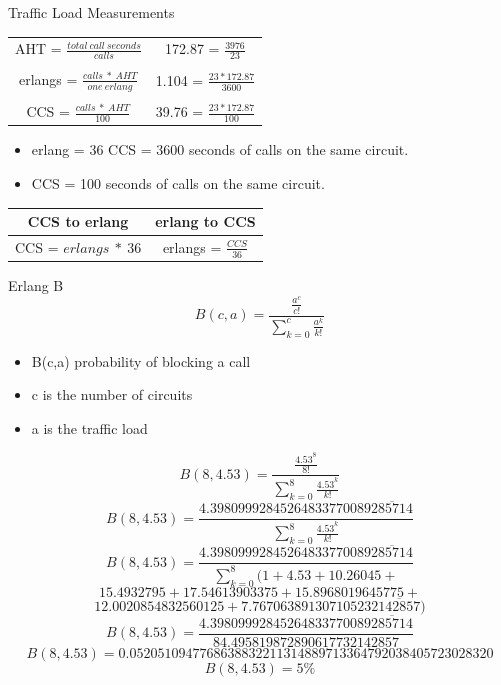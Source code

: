 \documentclass[landscape,fontscale=1,margin=0.2cm,paperwidth=70truecm, paperheight=40truecm,debug]{baposter}
\begin{document}
\begin{poster}
\begin{posterbox}[column=0,below=auto,height=bottom]{Traffic Load Measurements}
\begin{center}
\begin{tabular}{|c|c|}
AHT = $\frac{total~call~seconds}{calls}$ & 172.87 = $\frac{3976}{23}$\\
&\\
erlangs = $\frac{calls~*~AHT}{one~erlang}$ & 1.104 = $\frac{23 * 172.87}{3600}$\\
&\\
CCS = $\frac{calls~*~AHT}{100}$ & 39.76 = $\frac{23 * 172.87}{100}$\\\hline
\end{tabular}
\end{center}
\begin{itemize}
\item erlang = 36 CCS = 3600 seconds of calls on the same circuit.
\item CCS = 100 seconds of calls on the same circuit.
\end{itemize}
\begin{center}
\begin{tabular}{|c|c|}
\hline
CCS to erlang&erlang to CCS\\\hline
CCS = $erlangs~ *~36$ & erlangs = $\frac{CCS}{36}$\\\hline
\end{tabular}
\end{center}
\end{posterbox}
\begin{posterbox}[column=1]{Erlang B}
\[
B(c,a) = \frac{\frac{a^c}{c!}}{\sum\limits_{k=0}^{c} \frac{a^k}{k!}}
\]
\begin{itemize}
\item B(c,a) probability of blocking a call
\item c is the number of circuits
\item a is the traffic load
\end{itemize}
\[
B(8,4.53) = \frac{\frac{4.53^8}{8!}}{\sum\limits_{k=0}^{8}\frac{4.53^k}{k!}}
\]
\[
B(8,4.53) = \frac{4.39809992845264833770089\overline{285714}}{\sum\limits_{k=0}^{8}\frac{4.53^k}{k!}}
\]
\[
B(8,4.53) = \frac{4.39809992845264833770089\overline{285714}}{\sum\limits_{k=0}^{8} (1 + 4.53 + 10.26045 +}
\]
\[
15.4932795 + 17.54613903375 + 15.8968019645775 +
\]
\[
 12.0020854832560125 + 7.767063891307105232\overline{142857})
\]
\[
\]
\[
B(8,4.53) = \frac{4.39809992845264833770089\overline{285714}}{84.495819872890617732142857}
\]
\[
B(8,4.53) = 0.0520510947768638832211314889713364792038405723028320
\]
\[
B(8,4.53) = 5\%
\]


\end{posterbox}
\end{poster}
\end{document}
